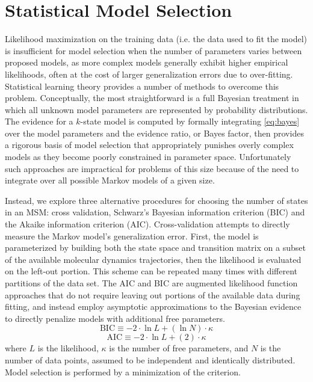 \documentclass[journal=jpcbfk, layout=traditional, manuscript=article]{achemso}
\begin{document}
\section{Statistical Model Selection}
Likelihood maximization on the training data (i.e. the data used to fit the model) is insufficient for model selection when the number of parameters varies between proposed models, as more complex models generally exhibit higher empirical likelihoods, often at the cost of larger generalization errors due to over-fitting\cite{Liddle2007Information, Hastie01Elements}. Statistical learning theory provides a number of methods to overcome this problem. Conceptually, the most straightforward is a full Bayesian treatment in which all unknown model parameters are represented by probability distributions. The evidence for a $k$-state model is computed by formally integrating \cref{eq:bayes} over the model parameters and the evidence ratio, or Bayes factor\cite{Gelfand94Bayesian}, then provides a rigorous basis of model selection that appropriately punishes overly complex models as they become poorly constrained in parameter space. Unfortunately such approaches are impractical for problems of this size because of the need to integrate over all possible Markov models of a given size.

Instead, we explore three alternative procedures for choosing the number of states in an MSM: cross validation, Schwarz's Bayesian information criterion (BIC)\cite{Schwartz78Estimating} and the Akaike information criterion (AIC)\cite{Akaike1974AIC}. Cross-validation attempts to directly measure the Markov model's generalization error. First, the model is parameterized by building both the state space and transition matrix on a subset of the available molecular dynamics trajectories, then the likelihood is evaluated on the left-out portion. This scheme can be repeated many times with different partitions of the data set. The AIC and BIC are augmented likelihood function approaches that do not require leaving out portions of the available data during fitting, and instead employ asymptotic approximations to the Bayesian evidence to directly penalize models with additional free parameters.
\begin{equation}
\label{eq:bic}
\mathrm{BIC} \equiv -2\cdot \ln L + \left(\ln N \right)\cdot \kappa
\end{equation}
\begin{equation}
\label{eq:aic}
\mathrm{AIC} \equiv -2\cdot \ln L + \left(2\right) \cdot \kappa
\end{equation} where $L$ is the likelihood, $\kappa$ is the number of free parameters, and $N$ is the number of data points, assumed to be independent and identically distributed. Model selection is performed by a minimization of the criterion.
\end{document}
